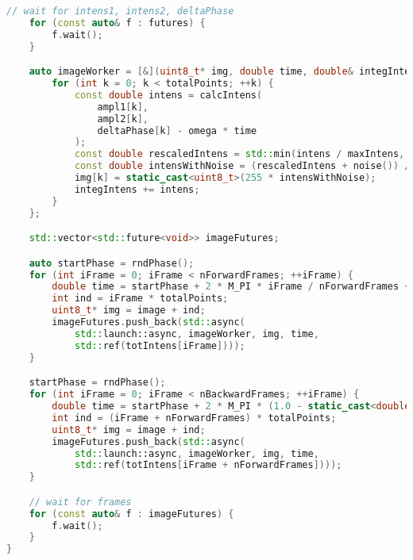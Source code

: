 \begin{lstlisting}[language=C++,tabsize=4,label={lst:calcImage},caption={Листинг функции вычисления интерференционной картины}]
    // wait for intens1, intens2, deltaPhase
	for (const auto& f : futures) {
		f.wait();
	}

    auto imageWorker = [&](uint8_t* img, double time, double& integIntens) {
        for (int k = 0; k < totalPoints; ++k) {
            const double intens = calcIntens(
                ampl1[k], 
                ampl2[k], 
                deltaPhase[k] - omega * time
            );
            const double rescaledIntens = std::min(intens / maxIntens, 1.0);
            const double intensWithNoise = (rescaledIntens + noise()) / (1 + noiseCoeff);
            img[k] = static_cast<uint8_t>(255 * intensWithNoise);
            integIntens += intens;
        }
    };

    std::vector<std::future<void>> imageFutures;

    auto startPhase = rndPhase();
    for (int iFrame = 0; iFrame < nForwardFrames; ++iFrame) {
        double time = startPhase + 2 * M_PI * iFrame / nForwardFrames + piezoNoise();
        int ind = iFrame * totalPoints;
        uint8_t* img = image + ind;
        imageFutures.push_back(std::async(
            std::launch::async, imageWorker, img, time,
            std::ref(totIntens[iFrame])));
    }

    startPhase = rndPhase();
    for (int iFrame = 0; iFrame < nBackwardFrames; ++iFrame) {
        double time = startPhase + 2 * M_PI * (1.0 - static_cast<double>(iFrame) / nBackwardFrames) + piezoNoise();
        int ind = (iFrame + nForwardFrames) * totalPoints;
        uint8_t* img = image + ind;
        imageFutures.push_back(std::async(
            std::launch::async, imageWorker, img, time,
            std::ref(totIntens[iFrame + nForwardFrames])));
    }

    // wait for frames
    for (const auto& f : imageFutures) {
        f.wait();
    }
}
\end{lstlisting}


